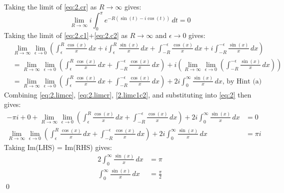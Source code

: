 \documentclass[a4paper, titlepage, DIV=14]{scrartcl}
\begin{document}
    Taking the limit of \eqref{eq:2.cr} as $R\to\infty$ gives:
    \begin{equation}
        \lim_{R\to\infty} i\int_{0}^{\pi}e^{-R(\sin(t)-i\cos(t))} \, dt = 0 \label{eq:2.limcr}
    \end{equation}
    Taking the limit of \eqref{eq:2.c1}+\eqref{eq:2.c2} as $R\to\infty$ and $\epsilon\to0$ gives:
    \begin{align}
        &\lim_{R\to\infty}\lim_{\epsilon\to0} (\int_{\epsilon}^{R} \frac{\cos(x)}{x} \, dx + i\int_{\epsilon}^{R} \frac{\sin(x)}{x} \, dx + \int_{-R}^{-\epsilon} \frac{\cos(x)}{x} \, dx + i\int_{-R}^{-\epsilon} \frac{\sin(x)}{x} \, dx) \nonumber\\
        &= \lim_{R\to\infty}\lim_{\epsilon\to0}(\int_{\epsilon}^{R} \frac{\cos(x)}{x} \, dx + \int_{-R}^{-\epsilon} \frac{\cos(x)}{x} \, dx) + i (\lim_{R\to\infty}\lim_{\epsilon\to0}(\int_{-R}^{-\epsilon} \frac{\sin(x)}{x} \, dx)) \nonumber\\
        &= \lim_{R\to\infty}\lim_{\epsilon\to0}(\int_{\epsilon}^{R} \frac{\cos(x)}{x} \, dx + \int_{-R}^{-\epsilon} \frac{\cos(x)}{x} \, dx) + 2i\int_{0}^{\infty}\frac{\sin(x)}{x}\, dx, \, \text{by Hint (a)} \label{2.limc1c2}
    \end{align}
    Combining \eqref{eq:2.limce}, \eqref{eq:2.limcr}, \eqref{2.limc1c2}, and substituting into \eqref{eq:2} then gives:
    \begin{align*}
        -\pi i + 0 + \lim_{R\to\infty}\lim_{\epsilon\to0}(\int_{\epsilon}^{R} \frac{\cos(x)}{x} \, dx + \int_{-R}^{-\epsilon} \frac{\cos(x)}{x} \, dx) + 2i\int_{0}^{\infty}\frac{\sin(x)}{x}\, dx &= 0 \\
        \lim_{R\to\infty}\lim_{\epsilon\to0}(\int_{\epsilon}^{R} \frac{\cos(x)}{x} \, dx + \int_{-R}^{-\epsilon} \frac{\cos(x)}{x} \, dx) + 2i\int_{0}^{\infty}\frac{\sin(x)}{x}\, dx &= \pi i
    \end{align*}
    Taking Im(LHS) = Im(RHS) gives:
    \begin{align*}
        2\int_{0}^{\infty}\frac{\sin(x)}{x}\, dx &= \pi \\
        \int_{0}^{\infty}\frac{\sin(x)}{x}\, dx &= \frac{\pi}{2} 
    \end{align*} \qed
    
\end{document}
